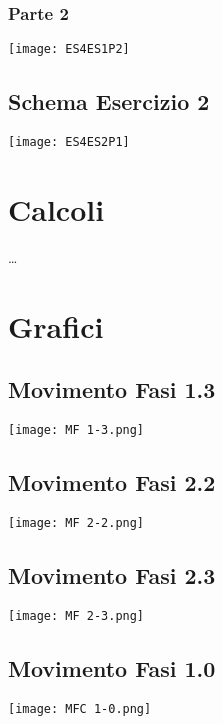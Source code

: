 \documentclass[a4paper]{article}
\begin{document}
\subsubsection{Parte 2}
\begin{center}
\texttt{[image: ES4ES1P2]}
\end{center}

\subsection{Schema Esercizio 2}
\begin{center}
\texttt{[image: ES4ES2P1]}
\end{center}


\section{Calcoli}
\dots

\section{Grafici}

\subsection{Movimento Fasi 1.3}
\begin{center}
\texttt{[image: MF 1-3.png]}
\end{center}

\subsection{Movimento Fasi 2.2}
\begin{center}
\texttt{[image: MF 2-2.png]}
\end{center}

\subsection{Movimento Fasi 2.3}
\begin{center}
\texttt{[image: MF 2-3.png]}
\end{center}

\subsection{Movimento Fasi 1.0}
\begin{center}
\texttt{[image: MFC 1-0.png]}
\end{center}
\end{document}
